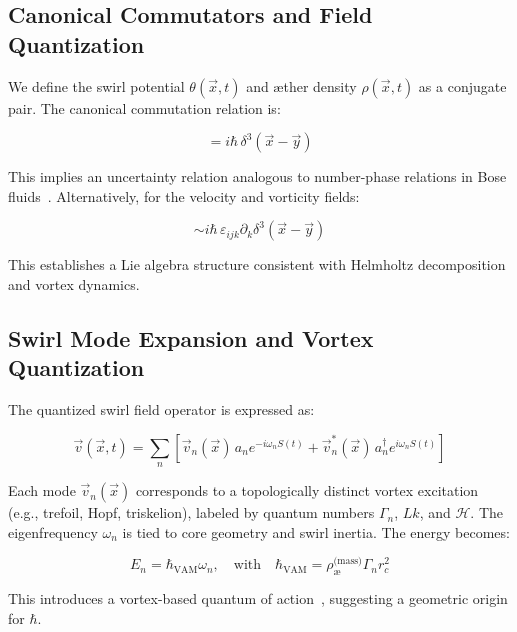 \documentclass[preprint]{revtex4-2}
\begin{document}
    \subsection{Canonical Commutators and Field Quantization}
    We define the swirl potential \( \theta(\vec{x}, t) \) and æther density \( \rho(\vec{x}, t) \) as a conjugate pair. The canonical commutation relation is:

    \begin{equation}
    [\theta(\vec{x}), \rho(\vec{y})] = i\hbar\,\delta^3(\vec{x} - \vec{y})
    \label{eq:canonical_commutator}
    \end{equation}

    This implies an uncertainty relation analogous to number-phase relations in Bose fluids~\cite{volovik2003universe}. Alternatively, for the velocity and vorticity fields:

    \begin{equation}
    [v_i(\vec{x}), \omega_j(\vec{y})] \sim i\hbar\,\varepsilon_{ijk} \partial_k \delta^3(\vec{x} - \vec{y})
    \end{equation}

    This establishes a Lie algebra structure consistent with Helmholtz decomposition and vortex dynamics.

    \subsection{Swirl Mode Expansion and Vortex Quantization}
    The quantized swirl field operator is expressed as:

    \begin{equation}
    \vec{v}(\vec{x}, t) = \sum_n \left[ \vec{v}_n(\vec{x})\, a_n e^{-i\omega_n S(t)} + \vec{v}_n^*(\vec{x})\, a_n^\dagger e^{i\omega_n S(t)} \right]
    \end{equation}

    Each mode \( \vec{v}_n(\vec{x}) \) corresponds to a topologically distinct vortex excitation (e.g., trefoil, Hopf, triskelion), labeled by quantum numbers \( \Gamma_n \), \( Lk \), and \( \mathcal{H} \). The eigenfrequency \( \omega_n \) is tied to core geometry and swirl inertia. The energy becomes:

    \begin{equation}
    E_n = \hbar_{\text{VAM}} \omega_n, \quad \text{with} \quad \hbar_{\text{VAM}} = \rho_{\text{\ae}}^{\text{(mass)}} \Gamma_n r_c^2
    \end{equation}

    This introduces a vortex-based quantum of action~\cite{ranada1992knots}, suggesting a geometric origin for \( \hbar \).
\end{document}
